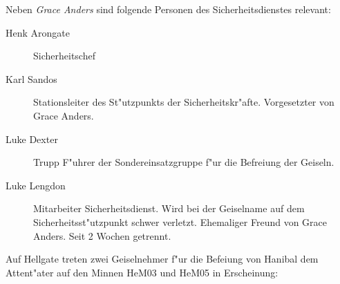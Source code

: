 
Neben \emph{Grace Anders} sind folgende Personen des Sicherheitsdienstes relevant:

\begin{description}
    \item[Henk Arongate] Sicherheitschef    
    \item[Karl Sandos] Stationsleiter des St"utzpunkts der Sicherheitskr"afte. Vorgesetzter von Grace Anders.
    \item[Luke Dexter] Trupp F"uhrer der Sondereinsatzgruppe f"ur die Befreiung der Geiseln.
    \item[Luke Lengdon] Mitarbeiter Sicherheitsdienst. Wird bei der Geiselname auf dem Sicherheitsst"utzpunkt schwer 
        verletzt. Ehemaliger Freund von Grace Anders. Seit 2 Wochen getrennt.
\end{description}

\vfill\pagebreak


Auf Hellgate treten zwei Geiselnehmer f"ur die Befeiung von Hanibal dem Attent"ater auf den Minnen HeM03 und HeM05 in
Erscheinung:



